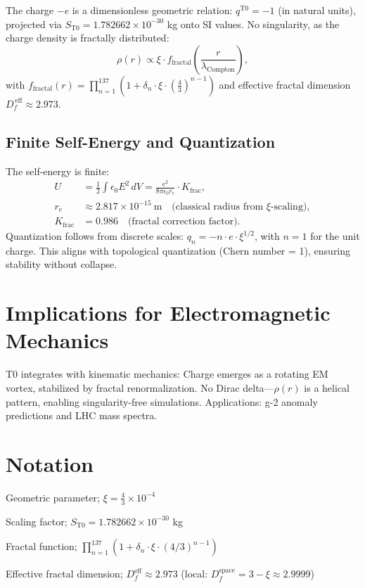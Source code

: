	The charge $-e$ is a dimensionless geometric relation: $q^{\mathrm{T0}} = -1$ (in natural units), projected via $S_{\mathrm{T0}} = 1.782662 \times 10^{-30}$ kg onto SI values. No singularity, as the charge density is fractally distributed:
	\begin{equation}
		\rho(r) \propto \xi \cdot f_{\text{fractal}}\left( \frac{r}{\lambda_{\text{Compton}}} \right),
	\end{equation}
	with $f_{\text{fractal}}(r) = \prod_{n=1}^{137} \left(1 + \delta_n \cdot \xi \cdot \left(\frac{4}{3}\right)^{n-1}\right)$ and effective fractal dimension $D_f^{\,\text{eff}} \approx 2.973$.
	
	\subsection{Finite Self-Energy and Quantization}
	The self-energy is finite:
	\begin{align}
		U &= \frac{1}{2} \int \epsilon_0 E^2 \, dV = \frac{e^2}{8\pi \epsilon_0 r_e} \cdot K_{\text{frac}}, \\
		r_e &\approx 2.817 \times 10^{-15}~\mathrm{m} \quad \text{(classical radius from $\xi$-scaling)}, \\
		K_{\text{frac}} &= 0.986 \quad \text{(fractal correction factor)}.
	\end{align}
	Quantization follows from discrete scales: $q_n = -n \cdot e \cdot \xi^{1/2}$, with $n=1$ for the unit charge. This aligns with topological quantization (Chern number = 1), ensuring stability without collapse.
	
	\section{Implications for Electromagnetic Mechanics}
	\label{sec:emm}
	
	T0 integrates with kinematic mechanics: Charge emerges as a rotating EM vortex, stabilized by fractal renormalization. No Dirac delta—$\rho(r)$ is a helical pattern, enabling singularity-free simulations. Applications: g-2 anomaly predictions and LHC mass spectra.
	
	\section{Notation}
	\begin{description}[leftmargin=1cm]
		\item[$\xi$] Geometric parameter; $\xi = \frac{4}{3} \times 10^{-4}$
		\item[$S_{\mathrm{T0}}$] Scaling factor; $S_{\mathrm{T0}} = 1.782662 \times 10^{-30}$ kg
		\item[$f_{\text{fractal}}$] Fractal function; $\prod_{n=1}^{137} (1 + \delta_n \cdot \xi \cdot (4/3)^{n-1})$
		\item[$D_f^{\text{eff}}$] Effective fractal dimension; $D_f^{\text{eff}} \approx 2.973$ (local: $D_f^{\text{space}} = 3 - \xi \approx 2.9999$)
	\end{description}
	
	\begin{center}
	\end{center}
